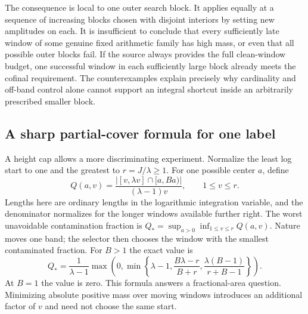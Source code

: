 \documentclass[12pt,letterpaper]{article}
\begin{document}
The consequence is local to one outer search block. It applies equally at a sequence of increasing blocks chosen with disjoint interiors by setting new amplitudes on each. It is insufficient to conclude that every sufficiently late window of some genuine fixed arithmetic family has high mass, or even that all possible outer blocks fail. If the source always provides the full clean-window budget, one successful window in each sufficiently large block already meets the cofinal requirement. The counterexamples explain precisely why cardinality and off-band control alone cannot support an integral shortcut inside an arbitrarily prescribed smaller block.

\subsection{A sharp partial-cover formula for one label}
A height cap allows a more discriminating experiment. Normalize the least log start to one and the greatest to \(r=J/\lambda\ge1\). For one possible center \(a\), define
\[
 Q(a,v)=\frac{|[v,\lambda v]\cap[a,Ba)|}{(\lambda-1)v},
                    \qquad 1\le v\le r.
\]
Lengths here are ordinary lengths in the logarithmic integration variable, and the denominator normalizes for the longer windows available further right. The worst unavoidable contamination fraction is \(Q_* = \sup_{a>0}\inf_{1\le v\le r}Q(a,v)\). Nature moves one band; the selector then chooses the window with the smallest contaminated fraction. For \(B>1\) the exact value is
\begin{equation}
 Q_* = \frac{1}{\lambda-1}\max\!\left(0,\min\!\left\{
 \lambda-1,\frac{B\lambda-r}{B+r},
               \frac{\lambda(B-1)}{r+B-1}\right\}\right).
 \label{eq:geometry-fraction}
\end{equation}
At \(B=1\) the value is zero. This formula answers a fractional-area question. Minimizing absolute positive mass over moving windows introduces an additional factor of \(v\) and need not choose the same start.
\end{document}
